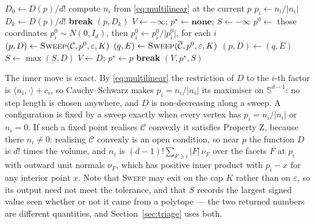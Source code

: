 \begin{algorithm}[ht]
\caption{Maximisation within a fixed type $\mathcal{C}$}
\label{alg:ascent}
\begin{algorithmic}[1]
    \State $D_{0} \gets D(p)/d!$
        \State compute $n_{i}$ from \eqref{eq:multilinear} at the current $p$
         $p_{i} \gets n_{i}/\lvert n_{i}\rvert$ \EndIf
      \EndFor
      \State $D_{k} \gets D(p)/d!$
       \textbf{break} \EndIf
    \EndFor
    \State \Return $(p, D_{k})$
  \EndFunction
  \Statex
    \State $V \gets -\infty$; \; $p^{\star} \gets \textbf{none}$; \;
           $S \gets -\infty$
       $p^{0} \gets$ those
        coordinates
      \Else{} $p^{0}_{i} \sim N(0, I_{d})$, then $p^{0}_{i} \gets
        p^{0}_{i}/\lvert p^{0}_{i}\rvert$, for each $i$
      \EndIf
      \State $(p, D) \gets \Call{Sweep}{\mathcal{C}, p^{0}, \varepsilon, K}$
        \State $(q, E) \gets \Call{Sweep}{\overline{\mathcal{C}}, p^{0},
               \varepsilon, K}$
         $(p, D) \gets (q, E)$ \EndIf
      \EndIf
      \State $S \gets \max(S, D)$
        $V \gets D$; \; $p^{\star} \gets p$
      \EndIf
       \textbf{break} \EndIf
    \EndFor
    \State \Return $(V, p^{\star}, S)$
  \EndFunction
\end{algorithmic}
\end{algorithm}

The inner move is exact. By \eqref{eq:multilinear} the restriction of $D$ to
the $i$-th factor is $\langle n_{i},\cdot\rangle + c_{i}$, so Cauchy--Schwarz
makes $p_{i} = n_{i}/\lvert n_{i}\rvert$ its maximiser on
$\mathbb{S}^{d-1}$: no step length is chosen anywhere, and $D$ is
non-decreasing along a sweep. A configuration is fixed by a sweep exactly when
every vertex has $p_{i} = n_{i}/\lvert n_{i}\rvert$ or $n_{i} = 0$. If such a
fixed point realises $\mathcal{C}$ convexly it satisfies Property Z, because
there $n_{i} \neq 0$: realising $\mathcal{C}$ convexly is an open condition,
so near $p$ the function $D$ is $d!$ times the volume, and $n_{i}$ is
$(d-1)!\sum_{F \ni i} \lvert F\rvert\,\nu_{F}$ over the facets $F$ at $p_{i}$
with outward unit normals $\nu_{F}$, which has positive inner product with
$p_{i} - x$ for any interior point $x$. Note that
\textsc{Sweep} may exit on the cap $K$ rather than on $\varepsilon$, so its
output need not meet the tolerance, and that $S$ records the largest signed
value seen whether or not it came from a polytope --- the two returned numbers
are different quantities, and Section~\ref{sec:triage} uses both.

